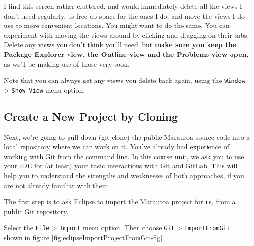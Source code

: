 \documentclass[
]{book}
\begin{document}
I find this screen rather cluttered, and would immediately delete all the views I don't need regularly, to free up space for the ones I do, and move the views I do use to more convenient locations. You might want to do the same. You can experiment with moving the views around by clicking and dragging on their tabs. Delete any views you don't think you'll need, but \textbf{make sure you keep the Package Explorer view, the Outline view and the Problems view open}, as we'll be making use of those very soon.

Note that you can always get any views you delete back again, using the \texttt{Window} \textgreater{} \texttt{Show\ View} menu option.

\hypertarget{newproj}{%
\subsection{Create a New Project by Cloning}\label{newproj}}

Next, we're going to pull down (git clone) the public Marauroa source code into a local repository where we can work on it. You've already had experience of working with Git from the command line. In this course unit, we ask you to use your IDE for (at least) your basic interactions with Git and GitLab. This will help you to understand the strengths and weaknesses of both approaches, if you are not already familiar with them.

The first step is to ask Eclipse to import the Marauroa project for us, from a public Git repository.

Select the \texttt{File} \textgreater{} \texttt{Import} menu option. Then choose \texttt{Git} \textgreater{} \texttt{ImportFromGit} shown in figure \ref{fig:eclipseImportProjectFromGit-fig}
\end{document}
